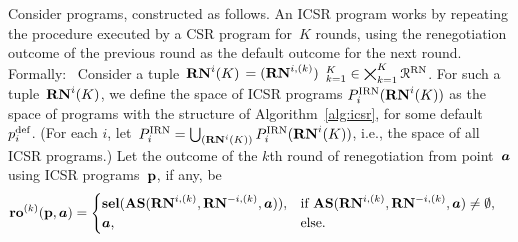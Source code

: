 \documentclass[sigconf]{aamas}
\newcommand{\selection}{sel}%
\newcommand{\renegb}{\mathbf{\selection}}
\theoremstyle{definition}
\begin{document}
Consider  programs, constructed as follows.
An ICSR program
works
by repeating the procedure
executed by a CSR program
for~${K}$ rounds,
using the renegotiation outcome
of the previous round
as the default outcome for the next
round.
Formally:\
Consider a tuple~$\mathbf{RN}^{i}({K})$ $= ({\mathbf{RN}}^{i,(k)})$ $_{k=1}^{{K}} \in \bigtimes_{k=1}^{{K}} \mathcal{R}^{\textnormal{RN}}$.
For such a tuple~$\mathbf{RN}^{i}({K})$,
we define
the space of
ICSR
programs
$P_i^{\textnormal{IRN}}(\mathbf{RN}^{i}({K}))$
as the
space of programs
with the structure
of
Algorithm~\ref{alg:icsr},
for some default~$p_i^{\textnormal{def}}$.
(For each $i$, 
let~$P_i^{\textnormal{IRN}} = \bigcup_{(\mathbf{RN}^{i}({K}))} P_i^{\textnormal{IRN}}(\mathbf{RN}^{i}({K}))$,
i.e.,
the space of all
ICSR
programs.)
Let the outcome of the $k$th round of
renegotiation from point~$\boldsymbol{a}$ using ICSR programs~$\textbf{p}$, if any, be 
\begin{align*}
\bargdefault^{(k)}(\fullprog, \fullact) &= 
     \begin{cases}
         \renegb(\intsect(\renegki, \renegkim, \fullact)),& \text{if }\intsect(\renegki, \renegkim, \fullact) \neq \emptyset, \\
         \fullact,& \text{else.}
    \end{cases}
\end{align*}
\end{document}
